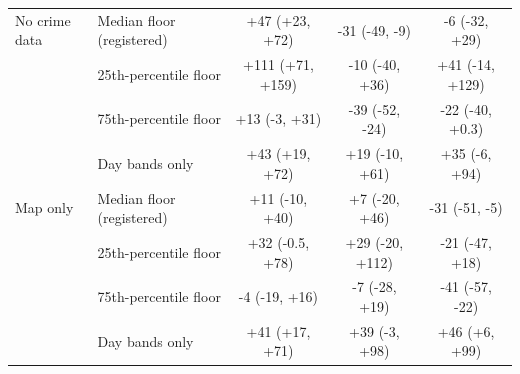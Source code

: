 \begin{tabular}{llccc}
No crime data & Median floor (registered) & +47 (+23, +72) & -31 (-49, -9) & -6 (-32, +29) \\
 & 25th-percentile floor & +111 (+71, +159) & -10 (-40, +36) & +41 (-14, +129) \\
 & 75th-percentile floor & +13 (-3, +31) & -39 (-52, -24) & -22 (-40, +0.3) \\
 & Day bands only & +43 (+19, +72) & +19 (-10, +61) & +35 (-6, +94) \\
\midrule
Map only & Median floor (registered) & +11 (-10, +40) & +7 (-20, +46) & -31 (-51, -5) \\
 & 25th-percentile floor & +32 (-0.5, +78) & +29 (-20, +112) & -21 (-47, +18) \\
 & 75th-percentile floor & -4 (-19, +16) & -7 (-28, +19) & -41 (-57, -22) \\
 & Day bands only & +41 (+17, +71) & +39 (-3, +98) & +46 (+6, +99) \\
\bottomrule
\end{tabular}
